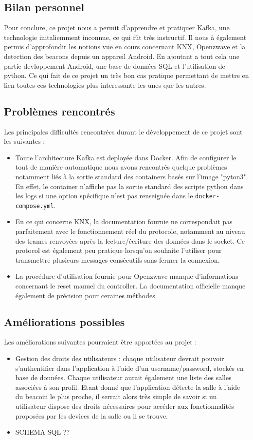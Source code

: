 \subsection{Bilan personnel}
Pour conclure, ce projet nous a permit d'apprendre et pratiquer Kafka, une technologie initaliemment inconnue, ce qui fût très instructif. Il nous à également permis d'approfondir les notions vue en cours concernant KNX, Openzwave et la detection des beacons depuis un appareil Android. En ajoutant a tout cela une partie devloppement Android, une base de données SQL et l'utilisation de python. Ce qui fait de ce projet un très bon cas pratique permettant de mettre en lien toutes ces technologies plus interessante les unes que les autres.

\subsection{Problèmes rencontrés}
Les principales difficultés rencontrées durant le développement de ce projet sont les suivantes :
\begin{itemize}
    \item Toute l'architecture Kafka est deployée dans Docker. Afin de configurer le tout de manière automatique nous avons rencontrés quelque problèmes notamment liés à la sortie standard des containers basés sur l'image "pyton3". En effet, le container n'affiche pas la sortie standard des scripts python dans les logs si une option spécifique n'est pas renseignée dans le \texttt{docker-compose.yml}.
    \item En ce qui concerne KNX, la documentation fournie ne correspondait pas parfaitement avec le fonctionnement réel du protocole, notamment au niveau des trames renvoyées après la lecture/écriture des données dans le socket. Ce protocol est également peu pratique lorsqu'on souhaite l'utiliser pour transmettre plusieurs messages consécutifs sans fermer la connexion.
    \item La procédure d'utilisation fournie pour Openzwave manque d'informations concernant le reset manuel du controller. La documentation officielle manque également de précision pour ceraines méthodes.
\end{itemize}

\subsection{Améliorations possibles}
Les améliorations suivantes pourraient être apportées au projet :
\begin{itemize}
    \item Gestion des droits des utilisateurs : chaque utilisateur devrait pouvoir s'authentifier dans l'application à l'aide d'un username/password, stockés en base de données. Chaque utilisateur aurait également une liste des salles associées à son profil. Etant donné que l'application détecte la salle à l'aide du beacoin le plus proche, il serrait alors très simple de savoir si un utilisateur dispose des droits nécessaires pour accéder aux fonctionnalités proposées par les devices de la salle ou il se trouve.
    \item SCHEMA SQL ??
\end{itemize}